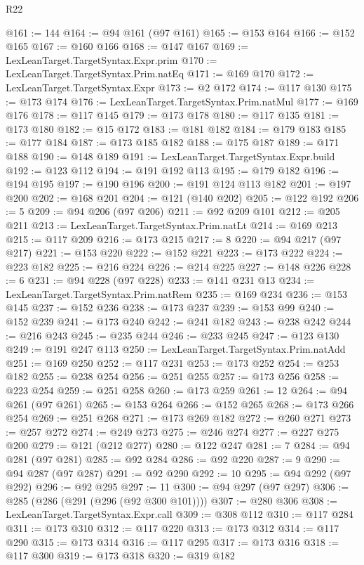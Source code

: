 \begin{lexlean}{R22}
\begin{coremodule}
@161 := 144
@164 := @94 @161 (@97 @161)
@165 := @153 @164
@166 := @152 @165
@167 := @160 @166
@168 := @147 @167
@169 := LexLeanTarget.TargetSyntax.Expr.prim
@170 := LexLeanTarget.TargetSyntax.Prim.natEq
@171 := @169 @170
@172 := LexLeanTarget.TargetSyntax.Expr
@173 := @2 @172
@174 := @117 @130
@175 := @173 @174
@176 := LexLeanTarget.TargetSyntax.Prim.natMul
@177 := @169 @176
@178 := @117 @145
@179 := @173 @178
@180 := @117 @135
@181 := @173 @180
@182 := @15 @172
@183 := @181 @182
@184 := @179 @183
@185 := @177 @184
@187 := @173 @185 @182
@188 := @175 @187
@189 := @171 @188
@190 := @148 @189
@191 := LexLeanTarget.TargetSyntax.Expr.build
@192 := @123 @112
@194 := @191 @192 @113
@195 := @179 @182
@196 := @194 @195
@197 := @190 @196
@200 := @191 @124 @113 @182
@201 := @197 @200
@202 := @168 @201
@204 := @121 (@140 @202)
@205 := @122 @192
@206 := 5
@209 := @94 @206 (@97 @206)
@211 := @92 @209 @101
@212 := @205 @211
@213 := LexLeanTarget.TargetSyntax.Prim.natLt
@214 := @169 @213
@215 := @117 @209
@216 := @173 @215
@217 := 8
@220 := @94 @217 (@97 @217)
@221 := @153 @220
@222 := @152 @221
@223 := @173 @222
@224 := @223 @182
@225 := @216 @224
@226 := @214 @225
@227 := @148 @226
@228 := 6
@231 := @94 @228 (@97 @228)
@233 := @141 @231 @13
@234 := LexLeanTarget.TargetSyntax.Prim.natRem
@235 := @169 @234
@236 := @153 @145
@237 := @152 @236
@238 := @173 @237
@239 := @153 @99
@240 := @152 @239
@241 := @173 @240
@242 := @241 @182
@243 := @238 @242
@244 := @216 @243
@245 := @235 @244
@246 := @233 @245
@247 := @123 @130
@249 := @191 @247 @113
@250 := LexLeanTarget.TargetSyntax.Prim.natAdd
@251 := @169 @250
@252 := @117 @231
@253 := @173 @252
@254 := @253 @182
@255 := @238 @254
@256 := @251 @255
@257 := @173 @256
@258 := @223 @254
@259 := @251 @258
@260 := @173 @259
@261 := 12
@264 := @94 @261 (@97 @261)
@265 := @153 @264
@266 := @152 @265
@268 := @173 @266 @254
@269 := @251 @268
@271 := @173 @269 @182
@272 := @260 @271
@273 := @257 @272
@274 := @249 @273
@275 := @246 @274
@277 := @227 @275 @200
@279 := @121 (@212 @277)
@280 := @122 @247
@281 := 7
@284 := @94 @281 (@97 @281)
@285 := @92 @284
@286 := @92 @220
@287 := 9
@290 := @94 @287 (@97 @287)
@291 := @92 @290
@292 := 10
@295 := @94 @292 (@97 @292)
@296 := @92 @295
@297 := 11
@300 := @94 @297 (@97 @297)
@306 := @285 (@286 (@291 (@296 (@92 @300 @101))))
@307 := @280 @306
@308 := LexLeanTarget.TargetSyntax.Expr.call
@309 := @308 @112
@310 := @117 @284
@311 := @173 @310
@312 := @117 @220
@313 := @173 @312
@314 := @117 @290
@315 := @173 @314
@316 := @117 @295
@317 := @173 @316
@318 := @117 @300
@319 := @173 @318
@320 := @319 @182

\end{coremodule}
\end{lexlean}
